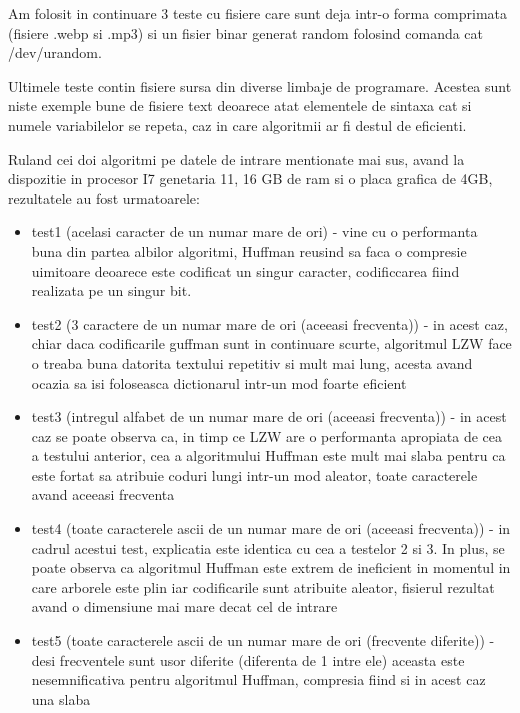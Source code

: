 \documentclass[runningheads]{llncs}
\begin{document}
Am folosit in continuare 3 teste cu fisiere care sunt deja intr-o forma comprimata (fisiere .webp si .mp3) si un fisier binar generat random folosind comanda cat /dev/urandom.

Ultimele teste contin fisiere sursa din diverse limbaje de programare. Acestea sunt niste exemple bune de fisiere text deoarece atat elementele de sintaxa cat si
numele variabilelor se repeta, caz in care algoritmii ar fi destul de eficienti.

Ruland cei doi algoritmi pe datele de intrare mentionate mai sus, avand la dispozitie in procesor I7 genetaria 11, 16 GB de ram si o placa grafica de 4GB, rezultatele au fost urmatoarele:


\begin{itemize}
    \item test1 (acelasi caracter de un numar mare de ori) - vine cu o performanta buna din partea
    albilor algoritmi, Huffman reusind sa faca o compresie uimitoare deoarece este codificat un singur caracter,
    codificcarea fiind realizata pe un singur bit.

    \item test2 (3 caractere de un numar mare de ori (aceeasi frecventa)) - in acest caz, chiar daca codificarile
    guffman sunt in continuare scurte, algoritmul LZW face o treaba buna datorita textului repetitiv si mult mai lung, acesta
    avand ocazia sa isi foloseasca dictionarul intr-un mod foarte eficient

    \item test3 (intregul alfabet de un numar mare de ori (aceeasi frecventa)) - in acest caz se poate observa ca,
    in timp ce LZW are o performanta apropiata de cea a testului anterior, cea a algoritmului Huffman este mult mai slaba
    pentru ca este fortat sa atribuie coduri lungi intr-un mod aleator, toate caracterele avand aceeasi frecventa

    \item test4 (toate caracterele ascii de un numar mare de ori (aceeasi frecventa)) - in cadrul acestui test, explicatia este
    identica cu cea a testelor 2 si 3. In plus, se poate observa ca algoritmul Huffman este extrem de ineficient in momentul in care
    arborele este plin iar codificarile sunt atribuite aleator, fisierul rezultat avand o dimensiune mai mare decat cel de intrare

    \item test5 (toate caracterele ascii de un numar mare de ori (frecvente diferite)) - desi frecventele sunt usor diferite (diferenta de 1 intre ele)
    aceasta este nesemnificativa pentru algoritmul Huffman, compresia fiind si in acest caz una slaba


\end{itemize}
\end{document}
